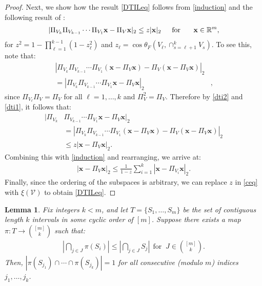 \documentclass[journal, twocolumn]{IEEEtran}
\newtheorem{lemma}{Lemma}
\begin{document}
\begin{proof}
Next, we show how the result \eqref{DTILeq} follows from \eqref{induction} and the following result of \cite[Thm.~9.33]{Deutsch12}:
\begin{align}\label{dti2}
|\Pi_{V_k}\Pi_{V_{k-1}}\cdots\Pi_{V_1} \mathbf{x} - \Pi_V\mathbf{x}|_2 \leq z |\mathbf{x}|_2 \indent \text{for } \indent \mathbf{x} \in \mathbb{R}^m,
\end{align}
for \mbox{$z^2= 1 - \prod_{\ell =1}^{k-1}(1-z_{\ell}^2)$} and \mbox{$z_{\ell} = \cos\theta_F\left(V_{\ell}, \cap_{s=\ell+1}^k V_s\right)$}. 
To see this, note that:
\begin{align}\label{dti1}
|\Pi_{V_k}\Pi_{V_{k-1}}\cdots\Pi_{V_1}(\mathbf{x} - \Pi_V\mathbf{x}) - \Pi_V(\mathbf{x} - \Pi_V\mathbf{x})|_2& \\
= |\Pi_{V_k}\Pi_{V_{k-1}}\cdots\Pi_{V_1} \mathbf{x} - \Pi_V \mathbf{x} |_2&,
\end{align}
since $\Pi_{V_\ell} \Pi_V = \Pi_V$ for all $\ell = 1, \ldots, k$ and $\Pi_V^2 = \Pi_V$.
Therefore by \eqref{dti2} and \eqref{dti1}, it follows that:
\begin{align*}
|\Pi_{V_k}&\Pi_{V_{k-1}}\cdots\Pi_{V_1} \mathbf{x} - \Pi_V \mathbf{x} |_2 \\
&= |\Pi_{V_k}\Pi_{V_{k-1}}\cdots\Pi_{V_1}(\mathbf{x} - \Pi_V\mathbf{x}) - \Pi_V(\mathbf{x} - \Pi_V\mathbf{x})|_2 \\
&\leq z |\mathbf{x} - \Pi_V\mathbf{x}|_2.
\end{align*}
Combining this with \eqref{induction} and rearranging, we arrive at:
\begin{align}\label{ceq}
|\mathbf{x} - \Pi_V \mathbf{x}|_2 \leq \frac{1}{1 - z} \sum_{i=1}^k |\mathbf{x} - \Pi_{V_i} \mathbf{x}|_2.
\end{align}
Finally, since the ordering of the subspaces is arbitrary, we can replace $z$ in \eqref{ceq} with $\xi(\mathcal{V})$ to obtain \eqref{DTILeq}.
\end{proof}


\begin{lemma}\label{NonEmptyLemma} Fix integers $k < m$, and let $T = \{S_1, \ldots, S_m\}$ be the set of contiguous length $k$ intervals in some cyclic order of $[m]$. Suppose there exists a map $\pi: T \to {[m] \choose k}$ such that:
\begin{align}\label{NonEmpty}
|\bigcap_{j \in J} \pi(S_i)| \leq |\bigcap_{j \in J} S_j | \ \ \text{for } \ J \in {[m] \choose k}.
\end{align}
%
Then, $|\pi(S_{j_1}) \cap \cdots \cap \pi(S_{j_k})| = 1$ for all consecutive (modulo $m$) indices $j_1,\ldots,j_k$.
\end{lemma}
\end{document}
